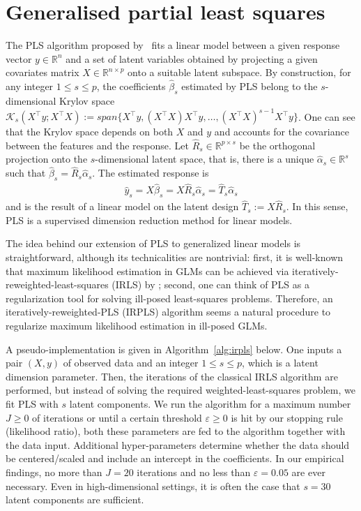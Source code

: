 \documentclass[12pt]{article}
\def\R{\mathbb{R}}
\def\eps{\varepsilon}
\begin{document}
\section{Generalised partial least squares}
{\color{red} The PLS algorithm proposed by~\citet{Wold66} fits a linear model between a given response vector $y\in\R^n$ and a set of latent variables obtained by projecting a given covariates matrix $X\in\R^{n\times p}$ onto a suitable latent subspace. By construction, for any integer $1\leq s\leq p$, the coefficients $\widehat\beta_s$ estimated by PLS belong to the $s$-dimensional Krylov space $\mathcal{K}_s(X^\top y;X^\top X):=span\{X^\top y,(X^\top X)X^\top y,\ldots,(X^\top X)^{s-1}X^\top y\}$. One can see that the Krylov space depends on both $X$ and $y$ and accounts for the covariance between the features and the response. Let $\widehat R_s\in\R^{p\times s}$ be the orthogonal projection onto the $s$-dimensional latent space, that is, there is a unique $\widehat\alpha_s\in\R^s$ such that $\widehat\beta_s=\widehat R_s\widehat\alpha_s$. The estimated response is 
\begin{align*}
    \widehat y_s = X\widehat\beta_s = X \widehat R_s \widehat\alpha_s = \widehat T_s \widehat\alpha_s
\end{align*}
and is the result of a linear model on the latent design $\widehat T_s := X \widehat R_s$. In this sense, PLS is a supervised dimension reduction method for linear models.

The idea behind our extension of PLS to generalized linear models is straightforward, although its technicalities are nontrivial: first, it is well-known that maximum likelihood estimation in GLMs can be achieved via iteratively-reweighted-least-squares (IRLS) by \citet{mccullagh1989glm}; second, one can think of PLS as a regularization tool for solving ill-posed least-squares problems. Therefore, an iteratively-reweighted-PLS (IRPLS) algorithm seems a natural procedure to regularize maximum likelihood estimation in ill-posed GLMs. 

A pseudo-implementation is given in Algorithm~\ref{alg:irpls} below. One inputs a pair $(X,y)$ of observed data and an integer $1\leq s\leq p$, which is a latent dimension parameter. Then, the iterations of the classical IRLS algorithm are performed, but instead of solving the required weighted-least-squares problem, we fit PLS with $s$ latent components. We run the algorithm for a maximum number $J\geq0$ of iterations or until a certain threshold $\eps\geq0$ is hit by our stopping rule (likelihood ratio), both these parameters are fed to the algorithm together with the data input. Additional hyper-parameters determine whether the data should be centered/scaled and include an intercept in the coefficients. In our empirical findings, no more than $J=20$ iterations and no less than $\eps=0.05$ are ever necessary. Even in high-dimensional settings, it is often the case that $s=30$ latent components are sufficient. 

}
\end{document}
